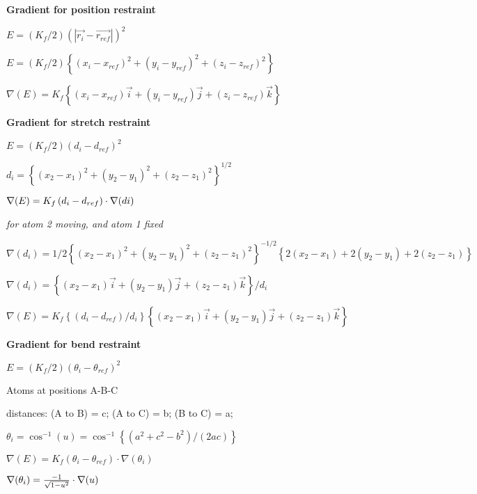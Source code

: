 {\bf Gradient for position restraint}

$E=\left( K_{f}/2\right) \left( \left| \overrightarrow{r_{i}}-%
\overrightarrow{r_{ref}}\right| \right) ^{2}$

$E=\left( K_{f}/2\right) \left\{ \left( x_{i}-x_{ref}\right) ^{2}+\left(
y_{i}-y_{ref}\right) ^{2}+\left( z_{i}-z_{ref}\right) ^{2}\right\} $

$\nabla (E)=K_{f}\left\{ \left( x_{i}-x_{ref}\right) \overrightarrow{i}%
+\left( y_{i}-y_{ref}\right) \overrightarrow{j}+\left( z_{i}-z_{ref}\right) 
\overrightarrow{k}\right\} $

{\bf Gradient for stretch restraint}

$E=\left( K_{f}/2\right) \left( d_{i}-d_{ref}\right) ^{2}$

$d_{i}=\left\{ \left( x_{2}-x_{1}\right) ^{2}+\left( y_{2}-y_{1}\right)
^{2}+\left( z_{2}-z_{1}\right) ^{2}\right\} ^{1/2}$

$\nabla (E)=K_{f}\left( d_{i}-d_{ref}\right) \cdot \nabla (di)\medskip $

{\em for atom 2 moving, and atom 1 fixed}

$\nabla (d_{i})=1/2\left\{ \left( x_{2}-x_{1}\right) ^{2}+\left(
y_{2}-y_{1}\right) ^{2}+\left( z_{2}-z_{1}\right) ^{2}\right\}
^{-1/2}\left\{ 2\left( x_{2}-x_{1}\right) +2\left( y_{2}-y_{1}\right)
+2\left( z_{2}-z_{1}\right) \right\} $

$\nabla (d_{i})=\left\{ \left( x_{2}-x_{1}\right) \overrightarrow{i}+\left(
y_{2}-y_{1}\right) \overrightarrow{j}+\left( z_{2}-z_{1}\right) 
\overrightarrow{k}\right\} /d_{i}$

$\nabla (E)=K_{f}\left\{ \left( d_{i}-d_{ref}\right) /d_{i}\right\} \left\{
\left( x_{2}-x_{1}\right) \overrightarrow{i}+\left( y_{2}-y_{1}\right) 
\overrightarrow{j}+\left( z_{2}-z_{1}\right) \overrightarrow{k}\right\} $

{\bf Gradient for bend restraint}

$E=\left( K_{f}/2\right) \left( \theta _{i}-\theta _{ref}\right) ^{2}$

Atoms at positions A-B-C

distances: (A to B) = c; (A to C) = b; (B to C) = a;

$\theta _{i}=\cos ^{-1}(u)=\cos ^{-1}\left\{ \left( a^{2}+c^{2}-b^{2}\right)
/\left( 2ac\right) \right\} $

$\nabla (E)=K_{f}\left( \theta _{i}-\theta _{ref}\right) \cdot \nabla
(\theta _{i})$

$\nabla (\theta _{i})=\frac{-1}{\sqrt{1-u^{2}}}\cdot \nabla (u)\medskip $

